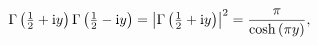 \[\Gamma\left(\tfrac{1}{2}+\mathrm{i}y\right)\Gamma\left(\tfrac{1}{2}-\mathrm{i}%
y\right)=\left|\Gamma\left(\tfrac{1}{2}+\mathrm{i}y\right)\right|^{2}=\frac{%
\pi}{\cosh\left(\pi y\right)},\]